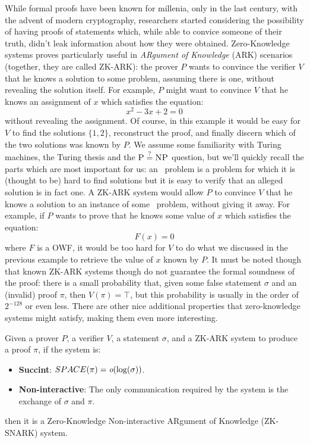\noindent While formal proofs have been known for millenia, only in the last century, with the
advent of modern cryptography, researchers started considering the possibility of having proofs
of statements which, while able to convice someone of their truth, didn't leak information
about how they were obtained.
Zero-Knowledge systems proves particularly useful in \emph{ARgument of Knowledge} (ARK) scenarios
(together, they are called ZK-ARK): the prover \(P\) wants to convince the verifier \(V\) that he
knows a solution to some problem, assuming there is one, without revealing the solution itself.
For example, \(P\) might want to convince \(V\) that he knows an assignment of \(x\) which
satisfies the equation:
\[x^2 - 3x + 2 = 0\]
without revealing the assignment.
Of course, in this example it would be easy for \(V\) to find the solutions \( \{1, 2\} \),
reconstruct the proof, and finally discern which of the two solutions was known by \(P\).
We assume some familiarity with Turing machines, the Turing thesis and the
\(\textsc{P} \stackrel{?}{=} \textsc{NP} \) question, but we'll quickly recall the parts which are most
important for us: an \NPcomp\ problem is a problem for which it is (thought to be) hard to find
solutions but it is easy to verify that an alleged solution is in fact one.
A ZK-ARK system would allow \(P\) to convince \(V\) that he knows a
solution to an instance of some \NPcomp\ problem, without giving it away.
For example, if \(P\) wants to prove that he knows some value of \(x\) which satisfies the equation:
\[F(x) = 0\]
where \(F\) is a OWF, it would be too hard for \(V\) to do what we discussed in the previous example
to retrieve the value of \(x\) known by \(P\).
It must be noted though that known ZK-ARK systems though do not guarantee the formal soundness of
the proof: there is a small probability that, given some false statement \(\sigma \) and an
(invalid) proof \(\pi \), then \(V(\pi) = \top \), but this probability is usually in the order of
\(2^{-128}\) or even less.
There are other nice additional properties that zero-knowledge systems might satisfy, making
them even more interesting.
\begin{definition}[ZK-SNARK]
	Given a prover \(P\), a verifier \(V\), a statement \(\sigma \), and a ZK-ARK system to produce
	a proof \(\pi \), if the system is:
	\begin{itemize}
		\item \textbf{Succint}: \(SPACE(\pi) = \textit{o}(\log(\sigma))\).
		\item \textbf{Non-interactive}: The only communication required by the system is the exchange
		      of \(\sigma \) and \(\pi \).
	\end{itemize}
	then it is a Zero-Knowledge Non-interactive ARgument of Knowledge (ZK-SNARK) system.
\end{definition}

